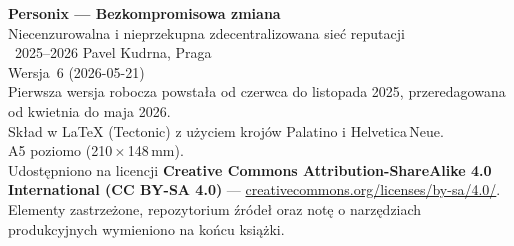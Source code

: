 \thispagestyle{empty}
\ifdefined\printmode\vspace*{\fill}\else{}\fi
\begin{flushleft}\small\sffamily
\textbf{Personix --- Bezkompromisowa zmiana}\\[0.3em]
Niecenzurowalna i nieprzekupna zdecentralizowana sieć reputacji\\[1.4em]

\textcopyright\ 2025--2026 Pavel Kudrna, Praga\\[0.4em]

Wersja~6 (2026-05-21)\\
Pierwsza wersja robocza powstała od czerwca do listopada 2025, przeredagowana od kwietnia do maja 2026.\\[1.4em]

Skład w \LaTeX{} (Tectonic) z użyciem krojów Palatino i Helvetica\,Neue.\\
A5 poziomo (210\,$\times$\,148\,mm).\\[1.4em]

Udostępniono na licencji \textbf{Creative Commons Attribution-ShareAlike 4.0
International (CC BY-SA 4.0)} ---
\href{https://creativecommons.org/licenses/by-sa/4.0/}{creativecommons.org/licenses/by-sa/4.0/}.
Elementy zastrzeżone, repozytorium źródeł oraz notę o narzędziach
produkcyjnych wymieniono na końcu książki.
\end{flushleft}
\ifdefined\printmode\else{}\fi
\clearpage

